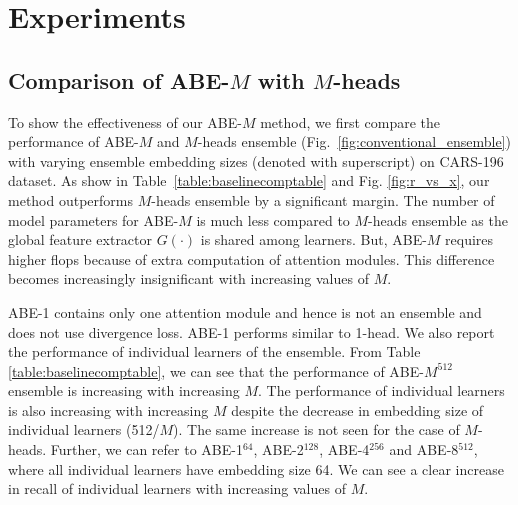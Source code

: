 \documentclass[runningheads]{llncs}
\begin{document}
\vspace{-2mm}
\section{Experiments} \label{experiments}
\vspace{-2mm}
\subsection{Comparison of ABE-$M$ with $M$-heads}
\vspace{-2mm}

To show the effectiveness of our ABE-$M$ method, we first compare the performance of ABE-$M$ and $M$-heads ensemble (Fig.~\ref{fig:conventional_ensemble}) with varying ensemble embedding sizes (denoted with superscript) on CARS-196 dataset.
As show in Table~\ref{table:baselinecomptable} and Fig. \ref{fig:r_vs_x},
our method outperforms $M$-heads ensemble by a significant margin.
The number of model parameters for ABE-$M$ is much less compared to $M$-heads ensemble as the global feature extractor $G(\cdot)$ is shared among learners.
But, ABE-$M$ requires higher flops because of extra computation of attention modules. This difference becomes increasingly insignificant with increasing values of $M$.

ABE-1 contains only one attention module and hence is not an ensemble and does not use divergence loss.
ABE-1 performs similar to 1-head.
We also report the performance of individual learners of the ensemble.
From Table \ref{table:baselinecomptable}, we can see that the performance of ABE-$M^{512}$ ensemble is increasing with increasing $M$.
The performance of individual learners is also increasing with increasing $M$ despite the decrease in embedding size of individual learners (512/$M$).
The same increase is not seen for the case of $M$-heads.
Further, we can refer to ABE-1$^{64}$, ABE-2$^{128}$, ABE-4$^{256}$ and ABE-8$^{512}$, where all individual learners have embedding size 64.
We can see a clear increase in recall of individual learners with increasing values of $M$.
\end{document}
